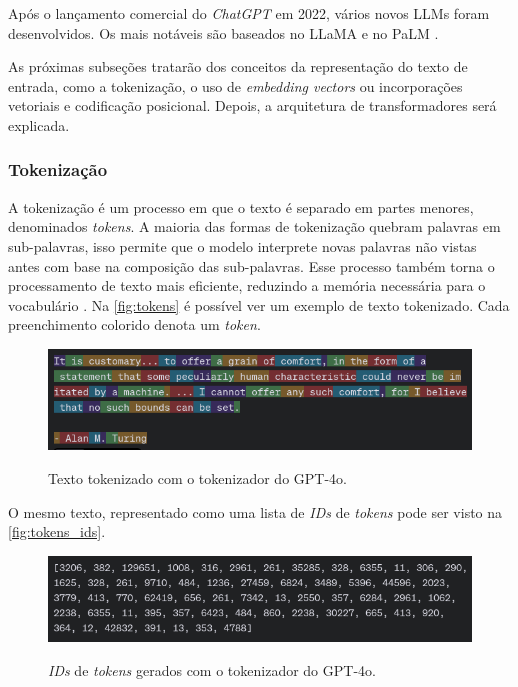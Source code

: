 Após o lançamento comercial do \textit{ChatGPT} em 2022, vários novos \acp{LLM} foram desenvolvidos. Os mais notáveis
são baseados no \ac{LLaMA} e no \ac{PaLM} \cite{llm_survey_2024}.

As próximas subseções tratarão dos conceitos da representação do texto de entrada, como a tokenização, o uso de
\textit{embedding vectors} ou incorporações vetoriais e codificação posicional. Depois, a arquitetura de
transformadores será explicada.

\subsubsection{Tokenização}

A tokenização é um processo em que o texto é separado em partes menores, denominados \textit{tokens}. A maioria das
formas de tokenização quebram palavras em sub-palavras, isso permite que o modelo interprete novas palavras não vistas
antes com base na composição das sub-palavras. Esse processo também torna o processamento de texto mais eficiente,
reduzindo a memória necessária para o vocabulário \cite{tokenizer_performance}. Na \autoref{fig:tokens} é possível ver
um exemplo de texto tokenizado. Cada preenchimento colorido denota um \textit{token}.

\clearpage

\begin{figure}[ht]
    \centering
    \caption{\small Texto tokenizado com o tokenizador do \ac{GPT}-4o.}
    \includegraphics[width=0.7\columnwidth,keepaspectratio]{images/tokens.png}
    \label{fig:tokens}
\end{figure}

O mesmo texto, representado como uma lista de \textit{IDs} de \textit{tokens} pode ser visto na
\autoref{fig:tokens_ids}.

\begin{figure}[ht]
    \centering
    \caption{\small \textit{IDs} de \textit{tokens} gerados com o tokenizador do \ac{GPT}-4o.}
    \includegraphics[width=0.7\columnwidth,keepaspectratio]{images/tokens_ids.png} \label{fig:tokens_ids}
\end{figure}

